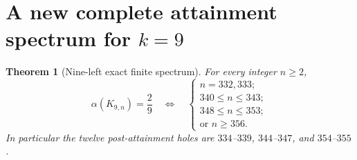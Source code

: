 \documentclass[11pt,a4paper]{article}
\newtheorem{theorem}{Theorem}[section]
\newcommand{\al}{\alpha}
\newcommand{\KK}[2]{K_{#1,#2}}
\begin{document}
\section{A new complete attainment spectrum for $k=9$}
\begin{theorem}[Nine-left exact finite spectrum]\label{thm:k9}
For every integer $n\ge2$,
\begin{equation}\label{eq:k9spectrum}
\al(\KK{9}{n})=\frac29\quad\Longleftrightarrow\quad
\left\{\begin{array}{l}
n=332,333;\\
340\le n\le343;\\
348\le n\le353;\\
\text{or }n\ge356.
\end{array}\right.
\end{equation}
In particular the twelve post-attainment holes are $334$--$339$, $344$--$347$, and $354$--$355$.
\end{theorem}
\end{document}
